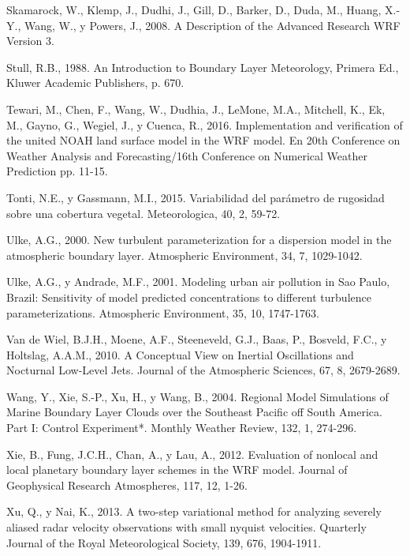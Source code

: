 \documentclass[12pt,spanish,oneside, a4paper]{book}
\begin{document}
\hypertarget{ref-Skamarock2008}{}
Skamarock, W., Klemp, J., Dudhi, J., Gill, D., Barker, D., Duda, M.,
Huang, X.-Y., Wang, W., y Powers, J., 2008. A Description of the
Advanced Research WRF Version 3.

\hypertarget{ref-Stull1988}{}
Stull, R.B., 1988. An Introduction to Boundary Layer Meteorology,
Primera Ed., Kluwer Academic Publishers, p. 670.

\hypertarget{ref-Tewari2004}{}
Tewari, M., Chen, F., Wang, W., Dudhia, J., LeMone, M.A., Mitchell, K.,
Ek, M., Gayno, G., Wegiel, J., y Cuenca, R., 2016. Implementation and
verification of the united NOAH land surface model in the WRF model. En
20th Conference on Weather Analysis and Forecasting/16th Conference on
Numerical Weather Prediction pp. 11-15.

\hypertarget{ref-Tonti2015}{}
Tonti, N.E., y Gassmann, M.I., 2015. Variabilidad del parámetro de
rugosidad sobre una cobertura vegetal. Meteorologica, 40, 2, 59-72.

\hypertarget{ref-Ulke2000}{}
Ulke, A.G., 2000. New turbulent parameterization for a dispersion model
in the atmospheric boundary layer. Atmospheric Environment, 34, 7,
1029-1042.

\hypertarget{ref-Ulke2001}{}
Ulke, A.G., y Andrade, M.F., 2001. Modeling urban air pollution in Sao
Paulo, Brazil: Sensitivity of model predicted concentrations to
different turbulence parameterizations. Atmospheric Environment, 35, 10,
1747-1763.

\hypertarget{ref-VanDeWiel2010}{}
Van de Wiel, B.J.H., Moene, A.F., Steeneveld, G.J., Baas, P., Bosveld,
F.C., y Holtslag, A.A.M., 2010. A Conceptual View on Inertial
Oscillations and Nocturnal Low-Level Jets. Journal of the Atmospheric
Sciences, 67, 8, 2679-2689.

\hypertarget{ref-Wang2004}{}
Wang, Y., Xie, S.-P., Xu, H., y Wang, B., 2004. Regional Model
Simulations of Marine Boundary Layer Clouds over the Southeast Pacific
off South America. Part I: Control Experiment*. Monthly Weather Review,
132, 1, 274-296.

\hypertarget{ref-Xie2012}{}
Xie, B., Fung, J.C.H., Chan, A., y Lau, A., 2012. Evaluation of nonlocal
and local planetary boundary layer schemes in the WRF model. Journal of
Geophysical Research Atmospheres, 117, 12, 1-26.

\hypertarget{ref-Xu2013}{}
Xu, Q., y Nai, K., 2013. A two-step variational method for analyzing
severely aliased radar velocity observations with small nyquist
velocities. Quarterly Journal of the Royal Meteorological Society, 139,
676, 1904-1911.
\end{document}

